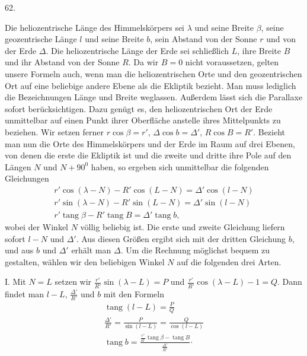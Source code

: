 \par{}\medskip
\hypertarget{native-081-article062}{}
\begin{center}62.\end{center}
Die heliozentrische Länge des Himmelskörpers sei $\lambda$ und seine Breite $\beta$, seine geozentrische Länge $l$ und seine Breite $b$, sein Abstand von der Sonne $r$ und von der Erde $\Delta$. Die heliozentrische Länge der Erde sei schließlich $L$, ihre Breite $B$ und ihr Abstand von der Sonne $R$. Da wir $B=0$ nicht voraussetzen, gelten unsere Formeln auch, wenn man die heliozentrischen Orte und den geozentrischen Ort auf eine beliebige andere Ebene als die Ekliptik bezieht. Man muss lediglich die Bezeichnungen Länge und Breite weglassen. Außerdem lässt sich die Parallaxe sofort berücksichtigen. Dazu genügt es, den heliozentrischen Ort der Erde unmittelbar auf einen Punkt ihrer Oberfläche anstelle ihres Mittelpunkts zu beziehen. Wir setzen ferner $r\cos\beta=r'$, $\Delta\cos b=\Delta'$, $R\cos B=R'$. Bezieht man nun die Orte des Himmelskörpers und der Erde im Raum auf drei Ebenen, von denen die erste die Ekliptik ist und die zweite und dritte ihre Pole auf den Längen $N$ und $N+90^0$ haben, so ergeben sich unmittelbar die folgenden Gleichungen
\[
\begin{gathered}
r'\cos(\lambda-N)-R'\cos(L-N)=\Delta'\cos(l-N)\\
r'\sin(\lambda-N)-R'\sin(L-N)=\Delta'\sin(l-N)\\
r'\operatorname{tang}\beta-R'\operatorname{tang}B=\Delta'\operatorname{tang}b,
\end{gathered}
\]
wobei der Winkel $N$ völlig beliebig ist. Die erste und zweite Gleichung liefern sofort $l-N$ und $\Delta'$. Aus diesen Größen ergibt sich mit der dritten Gleichung $b$, und aus $b$ und $\Delta'$ erhält man $\Delta$. Um die Rechnung möglichst bequem zu gestalten, wählen wir den beliebigen Winkel $N$ auf die folgenden drei Arten.

I. Mit $N=L$ setzen wir $\frac{r'}{R'}\sin(\lambda-L)=P$ und $\frac{r'}{R'}\cos(\lambda-L)-1=Q$. Dann findet man $l-L$, $\frac{\Delta'}{R'}$ und $b$ mit den Formeln
\[
\begin{gathered}
\operatorname{tang}(l-L)=\frac{P}{Q}\\[.5em]
\frac{\Delta'}{R'}=\frac{P}{\sin(l-L)}=\frac{Q}{\cos(l-L)}\\[.5em]
\operatorname{tang}b=\frac{\frac{r'}{R'}\operatorname{tang}\beta-\operatorname{tang}B}{\frac{\Delta'}{R'}}\mathord{\cdot}
\end{gathered}
\]

